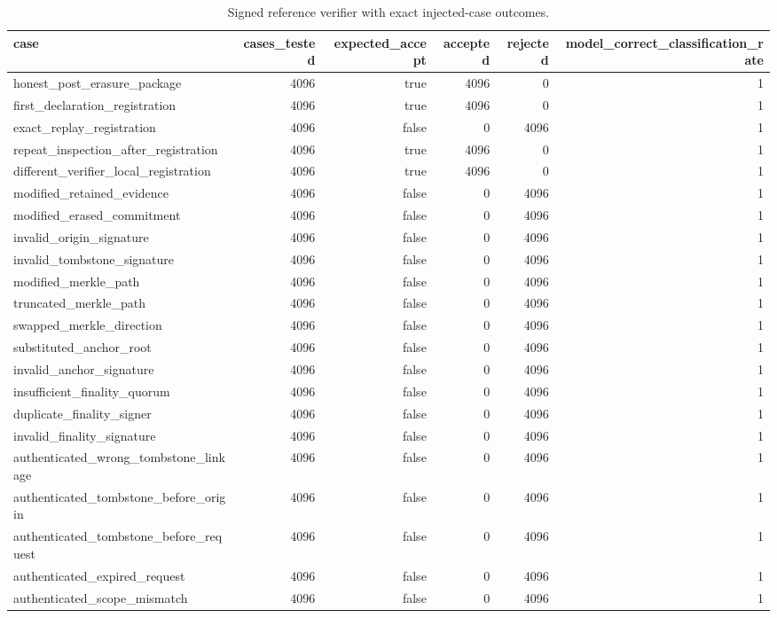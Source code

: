 \begin{table}[t]
\centering
\small
\caption{Signed reference verifier with exact injected-case outcomes.}
\label{tab:abstract-verifier}
\begin{tabular}{lrrrrr}
\toprule
case & cases\_tested & expected\_accept & accepted & rejected & model\_correct\_classification\_rate \\
\midrule
honest\_post\_erasure\_package & 4096 & true & 4096 & 0 & 1 \\
first\_declaration\_registration & 4096 & true & 4096 & 0 & 1 \\
exact\_replay\_registration & 4096 & false & 0 & 4096 & 1 \\
repeat\_inspection\_after\_registration & 4096 & true & 4096 & 0 & 1 \\
different\_verifier\_local\_registration & 4096 & true & 4096 & 0 & 1 \\
modified\_retained\_evidence & 4096 & false & 0 & 4096 & 1 \\
modified\_erased\_commitment & 4096 & false & 0 & 4096 & 1 \\
invalid\_origin\_signature & 4096 & false & 0 & 4096 & 1 \\
invalid\_tombstone\_signature & 4096 & false & 0 & 4096 & 1 \\
modified\_merkle\_path & 4096 & false & 0 & 4096 & 1 \\
truncated\_merkle\_path & 4096 & false & 0 & 4096 & 1 \\
swapped\_merkle\_direction & 4096 & false & 0 & 4096 & 1 \\
substituted\_anchor\_root & 4096 & false & 0 & 4096 & 1 \\
invalid\_anchor\_signature & 4096 & false & 0 & 4096 & 1 \\
insufficient\_finality\_quorum & 4096 & false & 0 & 4096 & 1 \\
duplicate\_finality\_signer & 4096 & false & 0 & 4096 & 1 \\
invalid\_finality\_signature & 4096 & false & 0 & 4096 & 1 \\
authenticated\_wrong\_tombstone\_linkage & 4096 & false & 0 & 4096 & 1 \\
authenticated\_tombstone\_before\_origin & 4096 & false & 0 & 4096 & 1 \\
authenticated\_tombstone\_before\_request & 4096 & false & 0 & 4096 & 1 \\
authenticated\_expired\_request & 4096 & false & 0 & 4096 & 1 \\
authenticated\_scope\_mismatch & 4096 & false & 0 & 4096 & 1 \\

\end{tabular}
\end{table}
